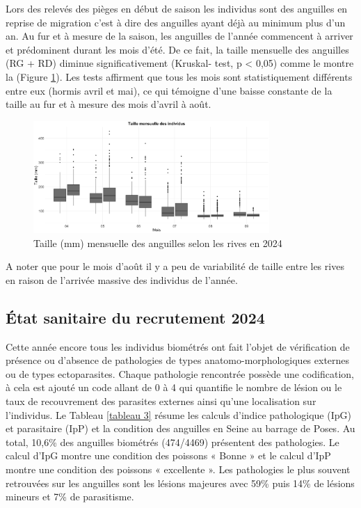 \documentclass[11pt,titlepage,twoside]{article}\usepackage[]{graphicx}\usepackage[table]{xcolor}
\begin{document}
Lors des relevés des pièges en début de saison les individus sont des anguilles en reprise de migration c’est à dire des anguilles ayant déjà au minimum plus d’un an. Au fur et à mesure de la saison, les anguilles de l’année commencent à arriver et prédominent durant les mois d’été. De ce fait, la taille mensuelle des anguilles (RG + RD) diminue significativement (Kruskal- test, p < 0,05) comme le montre la (Figure \ref{taille_mois_oral}). Les tests affirment que tous les mois sont statistiquement différents entre eux (hormis avril et mai), ce qui témoigne d’une baisse constante de la taille au fur et à mesure des mois d’avril à août.


\begin{figure}[htpb]
\centering
\includegraphics[width=0.8\textwidth]{taille_mois_oral.png}
\caption{Taille (mm) mensuelle des anguilles selon les rives en 2024}
\label{taille_mois_oral}
\end{figure} 

A noter que pour le mois d’août il y a peu de variabilité de taille entre les rives en raison de l’arrivée massive des individus de l’année. 

\subsection{État sanitaire du recrutement 2024}

Cette année encore tous les individus biométrés ont fait l’objet de vérification de présence ou d’absence de pathologies de types anatomo-morphologiques externes ou de types ectoparasites. Chaque pathologie rencontrée possède une codification, à cela est ajouté un code allant de 0 à 4 qui quantifie le nombre de lésion ou le taux de recouvrement des parasites externes ainsi qu’une localisation sur l’individus. Le Tableau \ref{tableau 3} résume les calculs d’indice pathologique (IpG) et parasitaire (IpP) et la condition des anguilles en Seine au barrage de Poses. Au total, 10,6\% des anguilles biométrés (474/4469) présentent des pathologies. Le calcul d’IpG montre une condition des poissons « Bonne » et le calcul d’IpP montre une condition des poissons « excellente ».  Les pathologies le plus souvent retrouvées sur les anguilles sont les lésions majeures avec 59\% puis 14\% de lésions mineurs et 7\% de parasitisme.
\end{document}
